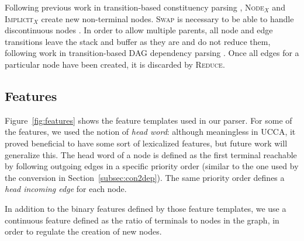 \documentclass[11pt]{article}
\newcommand{\secref}[1]{Section~\ref{#1}}
\newcommand{\figref}[1]{Figure~\ref{#1}}
\begin{document}
Following previous work in transition-based constituency parsing \cite{zhu2013fast}, \textsc{Node$_X$} and \textsc{Implicit$_X$} create new non-terminal nodes. \textsc{Swap} is necessary to be able to handle discontinuous nodes \cite{maier2015discontinuous}. In order to allow multiple parents, all node and edge transitions leave the stack and buffer as they are and do not reduce them, following work in transition-based DAG dependency parsing \cite{sagae2008shift,tokgoz2015transition}. Once all edges for a particular node have been created, it is discarded by \textsc{Reduce}.

\subsection{Features}
\label{subsec:features}

\figref{fig:features} shows the feature templates used in our parser. For some of the features, we used the notion of \textit{head word}: although meaningless in UCCA, it proved beneficial to have some sort of lexicalized features, but future work will generalize this. The head word of a node is defined as the first terminal reachable by following outgoing edges in a specific priority order (similar to the one used by the conversion in \secref{subsec:con2dep}). The same priority order defines a \textit{head incoming edge} for each node.

In addition to the binary features defined by those feature templates, we use a continuous feature defined as the ratio of terminals to nodes in the graph, in order to regulate the creation of new nodes.

\end{document}
